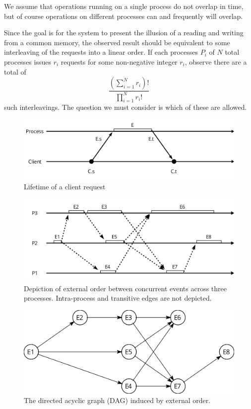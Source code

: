 \documentclass[]             %
{NASA}                       %
\theoremstyle{definition}
\begin{document}
We assume that operations running on a single process do not overlap
in time, but of course operations on different processes can and
frequently will overlap.


Since the goal is for the system to present
the illusion of a reading and writing from a common memory, the
observed result should be equivalent to some interleaving of the
requests into a linear order. If each processes $P_i$ of $N$ total
processes issues $r_i$ requests for some non-negative integer $r_i$,
observe there are a total of
\[
\frac{\left(\sum_{i = 1}^N r_i\right)!}{\prod_{i = 1}^N r_i!}
\]
such interleavings. The question we must consider is which of these
are allowed.


\begin{figure}[p]
  \center
  \includegraphics[scale=0.4]{images/request.png}
  \caption{Lifetime of a client request}
  \label{fig:request}
\end{figure}

\begin{figure}[p]
  \center
  \includegraphics[scale=0.4]{images/externalorder.png}
  \caption{Depiction of external order between concurrent events across three processes. Intra-process and transitive edges are not depicted.}
  \label{fig:externalorderexec}
\end{figure}

\begin{figure}[p]
    \center
    \includegraphics[scale=0.25]{images/partialorder.png}
    \caption{The directed acyclic graph (DAG) induced by external order.}
    \label{fig:externalorderdag}
\end{figure}
\end{document}
